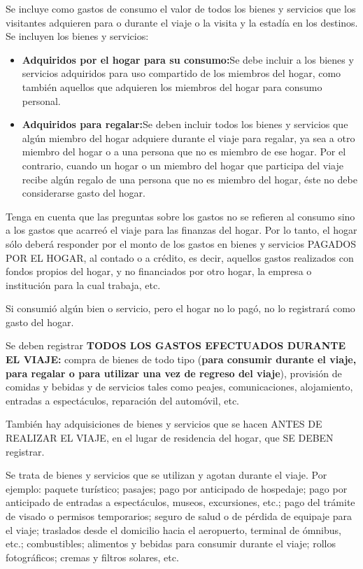 \documentclass[
  openany]{book}
\begin{document}
Se incluye como gastos de consumo el valor de todos los bienes y servicios que los visitantes adquieren para o durante el viaje o la visita y la estadía en los destinos. Se incluyen los bienes y servicios:

\begin{itemize}
\item
  \textbf{Adquiridos por el hogar para su consumo:}Se debe incluir a los bienes y servicios adquiridos para uso compartido de los miembros del hogar, como también aquellos que adquieren los miembros del hogar para consumo personal.
\item
  \textbf{Adquiridos para regalar:}Se deben incluir todos los bienes y servicios que algún miembro del hogar adquiere durante el viaje para regalar, ya sea a otro miembro del hogar o a una persona que no es miembro de ese hogar. Por el contrario, cuando un hogar o un miembro del hogar que participa del viaje recibe algún regalo de una persona que no es miembro del hogar, éste no debe considerarse gasto del hogar.
\end{itemize}

Tenga en cuenta que las preguntas sobre los gastos no se refieren al consumo sino a los gastos que acarreó el viaje para las finanzas del hogar. Por lo tanto, el hogar sólo deberá responder por el monto de los gastos en bienes y servicios PAGADOS POR EL HOGAR, al contado o a crédito, es decir, aquellos gastos realizados con fondos propios del hogar, y no financiados por otro hogar, la empresa o institución para la cual trabaja, etc.

Si consumió algún bien o servicio, pero el hogar no lo pagó, no lo registrará como gasto del hogar.

Se deben registrar \textbf{TODOS LOS GASTOS EFECTUADOS DURANTE EL VIAJE:} compra de bienes de todo tipo (\textbf{para consumir durante el viaje, para regalar o para utilizar una vez de regreso del viaje}), provisión de comidas y bebidas y de servicios tales como peajes, comunicaciones, alojamiento, entradas a espectáculos, reparación del automóvil, etc.

También hay adquisiciones de bienes y servicios que se hacen ANTES DE REALIZAR EL VIAJE, en el lugar de residencia del hogar, que SE DEBEN registrar.

Se trata de bienes y servicios que se utilizan y agotan durante el viaje. Por ejemplo: paquete turístico; pasajes; pago por anticipado de hospedaje; pago por anticipado de entradas a espectáculos, museos, excursiones, etc.; pago del trámite de visado o permisos temporarios; seguro de salud o de pérdida de equipaje para el viaje; traslados desde el domicilio hacia el aeropuerto, terminal de ómnibus, etc.; combustibles; alimentos y bebidas para consumir durante el viaje; rollos fotográficos; cremas y filtros solares, etc.
\end{document}
